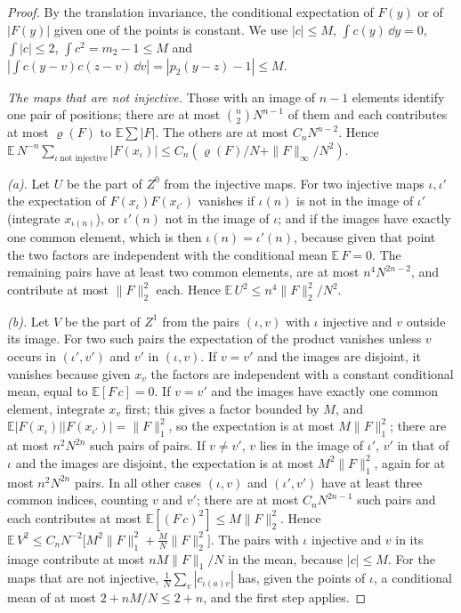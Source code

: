 \begin{proof}
By the translation invariance, the conditional expectation of $F(y)$ or of $|F(y)|$ given one of the points is constant. We use $|c|\le M$, $\int c(y)\,\dd y=0$, $\int|c|\le2$, $\int c^2=m_2-1\le M$ and $|\int c(y-v)c(z-v)\,\dd v|=|p_2(y-z)-1|\le M$.

\emph{The maps that are not injective.} Those with an image of $n-1$ elements identify one pair of positions; there are at most $\binom n2N^{n-1}$ of them and each contributes at most $\varrho(F)$ to $\mathbb E\sum|F|$. The others are at most $C_nN^{n-2}$. Hence $\mathbb E\,N^{-n}\sum_{\iota\ \text{not injective}}|F(x_\iota)|\le C_n(\varrho(F)/N+\|F\|_\infty/N^2)$.

\emph{(a).} Let $U$ be the part of $Z^0$ from the injective maps. For two injective maps $\iota,\iota'$ the expectation of $F(x_\iota)F(x_{\iota'})$ vanishes if $\iota(n)$ is not in the image of $\iota'$ (integrate $x_{\iota(n)}$), or $\iota'(n)$ not in the image of $\iota$; and if the images have exactly one common element, which is then $\iota(n)=\iota'(n)$, because given that point the two factors are independent with the conditional mean $\mathbb E\,F=0$. The remaining pairs have at least two common elements, are at most $n^4N^{2n-2}$, and contribute at most $\|F\|_2^2$ each. Hence $\mathbb E\,U^2\le n^4\|F\|_2^2/N^2$.

\emph{(b).} Let $V$ be the part of $Z^1$ from the pairs $(\iota,v)$ with $\iota$ injective and $v$ outside its image. For two such pairs the expectation of the product vanishes unless $v$ occurs in $(\iota',v')$ and $v'$ in $(\iota,v)$. If $v=v'$ and the images are disjoint, it vanishes because given $x_v$ the factors are independent with a constant conditional mean, equal to $\mathbb E[F\,c]=0$. If $v=v'$ and the images have exactly one common element, integrate $x_v$ first; this gives a factor bounded by $M$, and $\mathbb E|F(x_\iota)||F(x_{\iota'})|=\|F\|_1^2$, so the expectation is at most $M\|F\|_1^2$; there are at most $n^2N^{2n}$ such pairs of pairs. If $v\ne v'$, $v$ lies in the image of $\iota'$, $v'$ in that of $\iota$ and the images are disjoint, the expectation is at most $M^2\|F\|_1^2$, again for at most $n^2N^{2n}$ pairs. In all other cases $(\iota,v)$ and $(\iota',v')$ have at least three common indices, counting $v$ and $v'$; there are at most $C_nN^{2n-1}$ such pairs and each contributes at most $\mathbb E[(F\,c)^2]\le M\|F\|_2^2$. Hence $\mathbb E\,V^2\le C_nN^{-2}\big[M^2\|F\|_1^2+\frac MN\|F\|_2^2\big]$. The pairs with $\iota$ injective and $v$ in its image contribute at most $nM\|F\|_1/N$ in the mean, because $|c|\le M$. For the maps that are not injective, $\frac1N\sum_v|c_{\iota(a)v}|$ has, given the points of $\iota$, a conditional mean of at most $2+nM/N\le2+n$, and the first step applies.
\end{proof}

